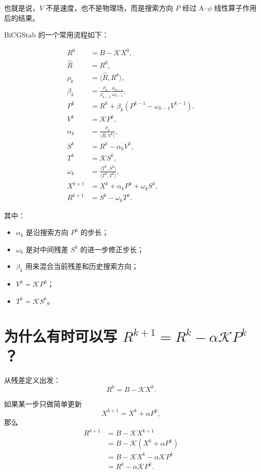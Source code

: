 \documentclass[UTF8,11pt]{ctexart}
\begin{document}
也就是说，$V$ 不是速度，也不是物理场，而是搜索方向 $P$ 经过 A--$\phi$ 线性算子作用后的结果。

BiCGStab 的一个常用流程如下：

\begin{align}
    R^0 &= B-\mathcal{K}X^0,\\
    \widehat{R} &= R^0,\\
    \rho_k &= \langle \widehat{R},R^k\rangle,\\
    \beta_k &=
    \frac{\rho_k}{\rho_{k-1}}
    \frac{\alpha_{k-1}}{\omega_{k-1}},\\
    P^k &=
    R^k+\beta_k(P^{k-1}-\omega_{k-1}V^{k-1}),\\
    V^k &= \mathcal{K}P^k,\\
    \alpha_k &=
    \frac{\rho_k}{\langle \widehat{R},V^k\rangle},\\
    S^k &= R^k-\alpha_k V^k,\\
    T^k &= \mathcal{K}S^k,\\
    \omega_k &=
    \frac{\langle T^k,S^k\rangle}
         {\langle T^k,T^k\rangle},\\
    X^{k+1}
    &=
    X^k+\alpha_k P^k+\omega_k S^k,\\
    R^{k+1}
    &=
    S^k-\omega_k T^k .
\end{align}

其中：
\begin{itemize}
    \item $\alpha_k$ 是沿搜索方向 $P^k$ 的步长；
    \item $\omega_k$ 是对中间残差 $S^k$ 的进一步修正步长；
    \item $\beta_k$ 用来混合当前残差和历史搜索方向；
    \item $V^k=\mathcal{K}P^k$；
    \item $T^k=\mathcal{K}S^k$。
\end{itemize}

\section{为什么有时可以写 $R^{k+1}=R^k-\alpha\mathcal{K}P^k$？}

从残差定义出发：
\begin{equation}
    R^k = B-\mathcal{K}X^k.
\end{equation}

如果某一步只做简单更新
\begin{equation}
    X^{k+1}=X^k+\alpha P^k,
\end{equation}
那么
\begin{align}
    R^{k+1}
    &=
    B-\mathcal{K}X^{k+1}
    \nonumber\\
    &=
    B-\mathcal{K}(X^k+\alpha P^k)
    \nonumber\\
    &=
    B-\mathcal{K}X^k-\alpha\mathcal{K}P^k
    \nonumber\\
    &=
    R^k-\alpha\mathcal{K}P^k.
\end{align}
\end{document}
